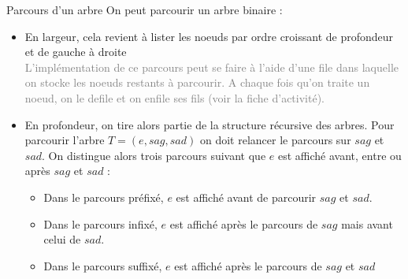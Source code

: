 \documentclass[10pt]{beamer}
\begin{document}
\begin{frame}
	\mframe{\AB}
	\begin{alertblock}{Parcours d'un arbre}
		On peut parcourir un arbre binaire :
		\begin{itemize}[label=\textbullet]
			\item<2-> En largeur, cela revient à lister les noeuds par ordre 
			croissant de profondeur et de gauche à droite \\
			\onslide<3-> \textcolor{gray}{L'implémentation de ce parcours peut 
			se faire à l'aide d'une file dans laquelle on stocke les noeuds 
			restants à parcourir. A chaque fois qu'on traite un noeud, on le 
			defile et on enfile ses fils (voir la fiche d'activité).}
			\item<3-> En profondeur, on tire alors partie de la structure 
			récursive des arbres. Pour parcourir l'arbre $T=(e,sag,sad)$ on 
			doit relancer le parcours sur $sag$ et $sad$. On distingue alors 
			trois parcours suivant que $e$ est affiché avant, entre ou après 
			$sag$ et $sad$ :
			\begin{itemize}[label=\textbullet]
				\item<4-> Dans le parcours préfixé, $e$ est affiché avant de 
				parcourir $sag$ et $sad$.
				\item<5-> Dans le parcours infixé, $e$ est affiché après le 
				parcours de $sag$ mais avant celui de  $sad$.
				\item<6-> Dans le parcours suffixé, $e$ est affiché après le 
				parcours de $sag$ et $sad$
			\end{itemize}
		\end{itemize}
	\end{alertblock}
\end{frame}
\end{document}

